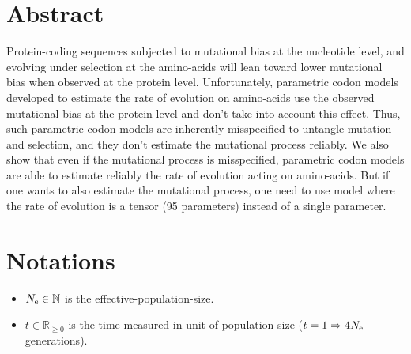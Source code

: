 \section{Abstract}

Protein-coding sequences subjected to mutational bias at the nucleotide level, and evolving under selection at the amino-acids will lean toward lower mutational bias when observed at the protein level. Unfortunately, parametric \gls{codon} models developed to estimate the rate of evolution on amino-acids use the observed mutational bias at the protein level and don't take into account this effect. Thus, such parametric \gls{codon} models are inherently misspecified to untangle mutation and selection, and they don't estimate the mutational process reliably. We also show that even if the mutational process is misspecified, parametric \gls{codon} models are able to estimate reliably the rate of evolution acting on amino-acids. But if one wants to also estimate the mutational process, one need to use model where the rate of evolution is a tensor (95 parameters) instead of a single parameter.

\section{Notations}

\begin{itemize}
	\item $N_{\textrm{e}} \in \mathbb{N}$ is the \gls{effective-population-size}.
	\item $t \in \mathbb{R}_{\geq 0}$ is the time measured in unit of population size ($t=1 \Rightarrow 4 N_{\textrm{e}} $ generations).
\end{itemize}

